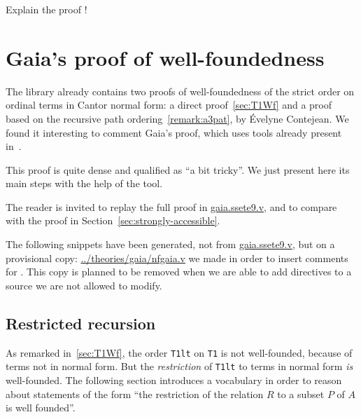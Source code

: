 
\begin{todo}
Explain the proof !
\end{todo}



\section{Gaia's proof of well-foundedness}
The library \Hydras already contains two proofs
of well-foundedness of the strict order on ordinal terms in
Cantor normal form: a direct proof~\vref{sec:T1Wf} and a proof based on the recursive path ordering~\vref{remark:a3pat}, by
\'Evelyne Contejean. We found it interesting to comment Gaia's proof, which uses tools already present in~\cite{CantorContrib}.



This proof is quite dense and qualified as ``a bit tricky''. We just present here its main steps with the help of the \alectr tool.

The reader is invited to replay the full proof in  \href{https://github.com/coq-community/gaia/blob/master/theories/ssete9.v}{gaia.ssete9.v}, and to compare with
the proof in Section~\ref{sec:strongly-accessible}.

\begin{remark}
  The following snippets have been generated, not from
  \href{https://github.com/coq-community/gaia/blob/master/theories/ssete9.v}{gaia.ssete9.v}, but on a provisional copy:
\url{../theories/gaia/nfgaia.v} we made in order to insert comments for \alectr.  This copy is planned to be removed when we are able to add \alectr directives to a \coq source we are not allowed to modify.
\end{remark}

\subsection{Restricted recursion}
As remarked in~\vref{sec:T1Wf}, the order \texttt{T1lt} on \texttt{T1} is not well-founded, because of terms not in normal form.
But the \emph{restriction} of \texttt{T1lt} to terms in normal form \emph{is} well-founded. The following section introduces a  vocabulary in order to reason about statements of the form  ``the restriction of the relation $R$ to a subset $P$ of $A$ is well founded''.





